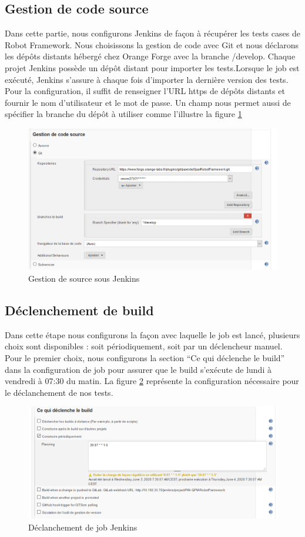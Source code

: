 \subsection{Gestion de code source}
Dans cette partie, nous configurons Jenkins de façon à récupérer les tests cases de Robot Framework. Nous choisissons la gestion de code avec Git et nous déclarons les dépôts distants hébergé chez Orange Forge avec la branche /develop. Chaque projet Jenkins possède un dépôt distant pour importer les tests.Lorsque le job est exécuté, Jenkins s’assure à chaque fois d’importer la dernière version des tests.\\Pour la configuration, il suffit de renseigner l’URL https de dépôts distants et fournir le nom d’utilisateur et le mot de passe. Un champ nous permet aussi de spécifier la branche du dépôt à utiliser comme l'illustre la figure \ref{fig:source-jenkins}
\begin{figure}[H]
	\centering
	\includegraphics[width=0.9\linewidth]{img/jenkins/source}
	\caption[Gestion de source sous Jenkins]{Gestion de source sous Jenkins}
	\label{fig:source-jenkins}
\end{figure}

\subsection{Déclenchement de build }
Dans cette étape nous configurons la façon avec laquelle le job est lancé, plusieurs choix sont disponibles : soit périodiquement, soit par un déclencheur manuel.\\
Pour le premier choix, nous configurons la section “Ce qui déclenche le build” dans la configuration de job pour assurer que le build s'exécute de lundi à vendredi à 07:30 du matin.
La figure \ref{fig:declanchement} représente la configuration nécessaire pour le déclanchement de nos tests.
\begin{figure}[H]
	\centering
	\includegraphics[width=0.8\linewidth]{img/jenkins/declanchement}
	\caption[Déclanchement de job Jenkins]{Déclanchement de job Jenkins}
	\label{fig:declanchement}
\end{figure}

